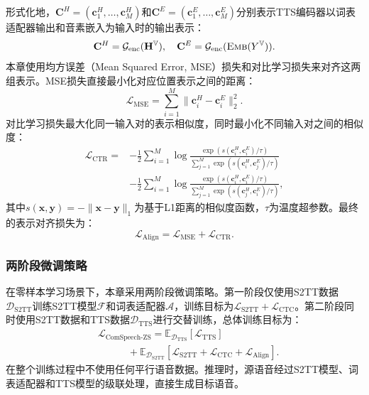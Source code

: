 形式化地，$\mathbf{C}^H = (\mathbf{c}^H_1, \ldots, \mathbf{c}^H_M)$和$\mathbf{C}^E = (\mathbf{c}^E_1, \ldots, \mathbf{c}^E_M)$分别表示TTS编码器以词表适配器输出和音素嵌入为输入时的输出表示：
\begin{equation}
    \mathbf{C}^H = \mathcal{G}_{\text{enc}} (\mathbf{H}^{\mathbb{V}}), \quad \mathbf{C}^E = \mathcal{G}_{\text{enc}} (\text{\textsc{Emb}}(Y^{\mathbb{V}})).
\end{equation}
本章使用均方误差（Mean Squared Error, MSE）损失和对比学习损失来对齐这两组表示。MSE损失直接最小化对应位置表示之间的距离：
\begin{equation}
    \mathcal{L}_{\text{MSE}} = \sum_{i=1}^M \| \mathbf{c}^H_i - \mathbf{c}^E_i \|^2_2.
\end{equation}
对比学习损失最大化同一输入对的表示相似度，同时最小化不同输入对之间的相似度：
\begin{equation}
\begin{aligned}
    \mathcal{L}_{\text{CTR}} = &-\frac{1}{2}\sum_{i=1}^M \log \frac{\exp(s(\mathbf{c}^H_i, \mathbf{c}^E_i) / \tau)}{\sum_{j=1}^M \exp (s(\mathbf{c}^H_i, \mathbf{c}^E_j) / \tau)} \\
    &-\frac{1}{2}\sum_{i=1}^M \log \frac{\exp(s(\mathbf{c}^H_i, \mathbf{c}^E_i) / \tau)}{\sum_{j=1}^M \exp (s(\mathbf{c}^H_j, \mathbf{c}^E_i) / \tau)},
\end{aligned}
\end{equation}
其中$s(\mathbf{x}, \mathbf{y}) = -\|\mathbf{x} - \mathbf{y}\|_1$为基于L1距离的相似度函数，$\tau$为温度超参数。最终的表示对齐损失为：
\begin{equation}
    \mathcal{L}_{\text{Align}} = \mathcal{L}_{\text{MSE}} + \mathcal{L}_{\text{CTR}}.
\end{equation}

\subsubsection{两阶段微调策略}

在零样本学习场景下，本章采用两阶段微调策略。第一阶段仅使用S2TT数据$\mathcal{D}_{\text{S2TT}}$训练S2TT模型$\mathcal{F}$和词表适配器$\mathcal{A}$，训练目标为$\mathcal{L}_{\text{S2TT}} + \mathcal{L}_{\text{CTC}}$。第二阶段同时使用S2TT数据和TTS数据$\mathcal{D}_{\text{TTS}}$进行交替训练，总体训练目标为：
\begin{equation}
    \begin{aligned}
        &\mathcal{L}_{\text{ComSpeech-ZS}} = \mathbb{E}_{\mathcal{D}_{\text{TTS}}} \left[\mathcal{L}_{\text{TTS}}\right] \\
        &\quad \quad \quad +\mathbb{E}_{\mathcal{D}_{\text{S2TT}}} \left[\mathcal{L}_{\text{S2TT}} + \mathcal{L}_{\text{CTC}} + \mathcal{L}_{\text{Align}}\right].
    \end{aligned}
\end{equation}
在整个训练过程中不使用任何平行语音数据。推理时，源语音经过S2TT模型、词表适配器和TTS模型的级联处理，直接生成目标语音。


